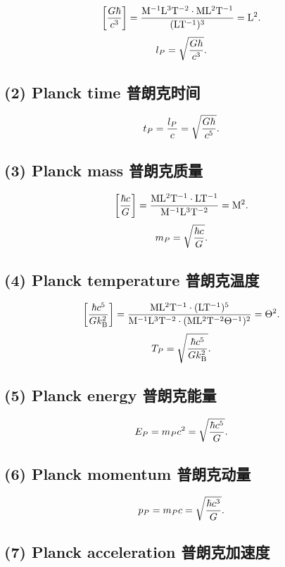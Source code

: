 \[\left[{G \hbar \over c^3}\right] = \mathrm{M^{-1}L^3T^{-2} \cdot ML^2T^{-1} \over (LT^{-1})^3} = \mathrm{L^2}.\]
\[l_P = \sqrt{G \hbar \over c^3}.\]

\subsection*{(2) Planck time
普朗克时间}\label{planck-time-ux666eux6717ux514bux65f6ux95f4}

\[t_P = {l_P \over c} = \sqrt{G \hbar \over c^5}.\]

\subsection*{(3) Planck mass
普朗克质量}\label{planck-mass-ux666eux6717ux514bux8d28ux91cf}

\[\left[{\hbar c \over G}\right]  = \mathrm{ML^2T^{-1} \cdot LT^{-1} \over M^{-1}L^3T^{-2}} = \mathrm{M^2}.\]
\[m_P = \sqrt{\hbar c\over G}.\]

\subsection*{(4) Planck temperature
普朗克温度}\label{planck-temperature-ux666eux6717ux514bux6e29ux5ea6}

\[\left[{\hbar c^5 \over Gk_\mathrm{B}^2}\right] = \mathrm{ML^2T^{-1} \cdot (LT^{-1})^5 \over M^{-1}L^3T^{-2} \cdot (ML^2T^{-2}\Theta^{-1})^2} = \mathrm{\Theta^2}.\]
\[T_P = \sqrt{\hbar c^5 \over Gk_\mathrm{B}^2}.\]

\subsection*{(5) Planck energy
普朗克能量}\label{planck-energy-ux666eux6717ux514bux80fdux91cf}

\[E_P = m_Pc^2 = \sqrt{\hbar c^5\over G}.\]

\subsection*{(6) Planck momentum
普朗克动量}\label{planck-momentum-ux666eux6717ux514bux52a8ux91cf}

\[p_P = m_Pc = \sqrt{\hbar c^3\over G}.\]

\subsection*{(7) Planck acceleration
普朗克加速度}\label{planck-acceleration-ux666eux6717ux514bux52a0ux901fux5ea6}

